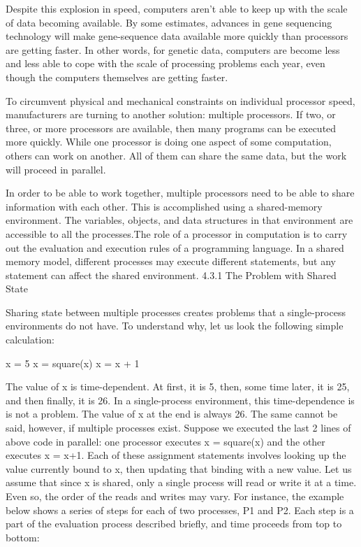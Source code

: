 \documentclass[letterpaper,10pt,dvipdfmx]{sphinxmanual}
\begin{document}
Despite this explosion in speed, computers aren't able to keep up with the scale of data becoming available. By some estimates, advances in gene sequencing technology will make gene-sequence data available more quickly than processors are getting faster. In other words, for genetic data, computers are become less and less able to cope with the scale of processing problems each year, even though the computers themselves are getting faster.

To circumvent physical and mechanical constraints on individual processor speed, manufacturers are turning to another solution: multiple processors. If two, or three, or more processors are available, then many programs can be executed more quickly. While one processor is doing one aspect of some computation, others can work on another. All of them can share the same data, but the work will proceed in parallel.

In order to be able to work together, multiple processors need to be able to share information with each other. This is accomplished using a shared-memory environment. The variables, objects, and data structures in that environment are accessible to all the processes.The role of a processor in computation is to carry out the evaluation and execution rules of a programming language. In a shared memory model, different processes may execute different statements, but any statement can affect the shared environment.
4.3.1   The Problem with Shared State

Sharing state between multiple processes creates problems that a single-process environments do not have. To understand why, let us look the following simple calculation:

x = 5
x = square(x)
x = x + 1

The value of x is time-dependent. At first, it is 5, then, some time later, it is 25, and then finally, it is 26. In a single-process environment, this time-dependence is is not a problem. The value of x at the end is always 26. The same cannot be said, however, if multiple processes exist. Suppose we executed the last 2 lines of above code in parallel: one processor executes x = square(x) and the other executes x = x+1. Each of these assignment statements involves looking up the value currently bound to x, then updating that binding with a new value. Let us assume that since x is shared, only a single process will read or write it at a time. Even so, the order of the reads and writes may vary. For instance, the example below shows a series of steps for each of two processes, P1 and P2. Each step is a part of the evaluation process described briefly, and time proceeds from top to bottom:
\end{document}
